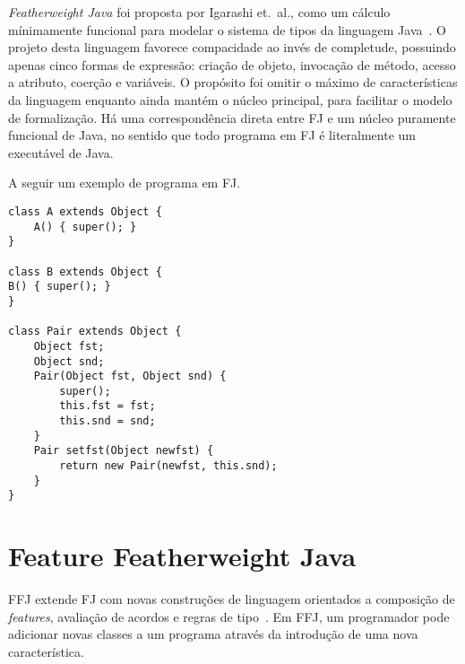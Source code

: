 \textit{Featherweight Java} foi proposta por Igarashi et.\ al., como um cálculo
mínimamente funcional para modelar o sistema de tipos da linguagem
Java~\cite{Igarashi99featherweightjava}.  O projeto desta linguagem favorece
compacidade ao invés de completude, possuindo apenas cinco formas de expressão:
criação de objeto, invocação de método, acesso a atributo, coerção e variáveis.
O propósito foi omitir o máximo de características da linguagem enquanto ainda
mantém o núcleo principal, para facilitar o modelo de formalização. Há uma
correspondência direta entre FJ e um núcleo puramente funcional de Java, no
sentido que todo programa em FJ é literalmente um executável de Java.


A seguir um exemplo de programa em FJ\@.

\begin{verbatim} 
class A extends Object {
    A() { super(); } 
} 

class B extends Object { 
B() { super(); }
} 

class Pair extends Object { 
    Object fst; 
    Object snd;
    Pair(Object fst, Object snd) { 
        super(); 
        this.fst = fst; 
        this.snd = snd; 
    } 
    Pair setfst(Object newfst) { 
        return new Pair(newfst, this.snd); 
    } 
} \end{verbatim}

\section{Feature Featherweight Java}

FFJ extende FJ com novas construções de linguagem orientados a composição de
\textit{features}\cite{fop}, avaliação de acordos e regras de
tipo~\cite{Apel08featurefeatherweight}. Em FFJ, um programador pode adicionar
novas classes a um programa através da introdução de uma nova característica.
    








